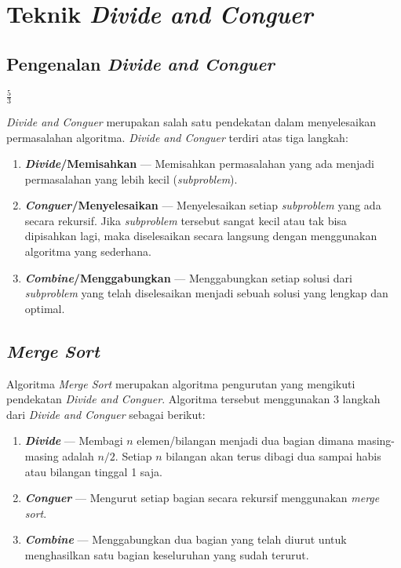 \chapter{Teknik \textit{Divide and Conguer}}\label{ch:modul4}


\section{Pengenalan \textit{Divide and Conguer}}
\begin{math}
	\frac{5}{3}
\end{math}

\textit{Divide and Conguer} merupakan salah satu pendekatan dalam menyelesaikan permasalahan algoritma. \textit{Divide and Conguer} terdiri atas tiga langkah:
\begin{enumerate}
	\item \textbf{\textit{Divide}/Memisahkan} --- Memisahkan permasalahan yang ada menjadi permasalahan yang lebih kecil (\textit{subproblem}).
	\item \textbf{\textit{Conguer}/Menyelesaikan} --- Menyelesaikan setiap \textit{subproblem} yang ada secara rekursif. Jika \textit{subproblem} tersebut sangat kecil atau tak bisa dipisahkan lagi, maka diselesaikan secara langsung dengan menggunakan algoritma yang sederhana.
	\item \textbf{\textit{Combine}/Menggabungkan} --- Menggabungkan setiap solusi dari \textit{subproblem} yang telah diselesaikan menjadi sebuah solusi yang lengkap dan optimal.
\end{enumerate}




\section{\textit{Merge Sort}}
Algoritma \textit{Merge Sort} merupakan algoritma pengurutan yang mengikuti pendekatan \textit{Divide and Conguer}. Algoritma tersebut menggunakan 3 langkah dari \textit{Divide and Conguer} sebagai berikut:
\begin{enumerate}
	\item \textbf{\textit{Divide}} --- Membagi $n$ elemen/bilangan menjadi dua bagian dimana masing-masing adalah $n/2$. Setiap $n$ bilangan akan terus dibagi dua sampai habis atau bilangan tinggal 1 saja.
	\item \textbf{\textit{Conguer}} --- Mengurut setiap bagian secara rekursif menggunakan \textit{merge sort}. 
	\item \textbf{\textit{Combine}} --- Menggabungkan dua bagian yang telah diurut untuk menghasilkan satu bagian keseluruhan yang sudah terurut.
\end{enumerate}

